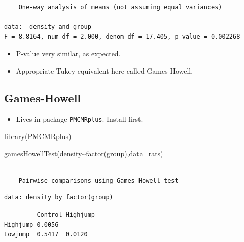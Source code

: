 \documentclass[
  letterpaper,
  DIV=11,
  numbers=noendperiod]{scrartcl}
\newenvironment{Shaded}{\begin{snugshade}}{\end{snugshade}}
\newcommand{\AttributeTok}[1]{\textcolor[rgb]{0.40,0.45,0.13}{#1}}
\newcommand{\FunctionTok}[1]{\textcolor[rgb]{0.28,0.35,0.67}{#1}}
\newcommand{\NormalTok}[1]{\textcolor[rgb]{0.00,0.23,0.31}{#1}}
\newcommand{\SpecialCharTok}[1]{\textcolor[rgb]{0.37,0.37,0.37}{#1}}
\providecommand{\tightlist}{%
  \setlength{\itemsep}{0pt}\setlength{\parskip}{0pt}}\usepackage{longtable,booktabs,array}
\begin{document}
\begin{verbatim}

    One-way analysis of means (not assuming equal variances)

data:  density and group
F = 8.8164, num df = 2.000, denom df = 17.405, p-value = 0.002268
\end{verbatim}

\begin{itemize}
\tightlist
\item
  P-value very similar, as expected.
\item
  Appropriate Tukey-equivalent here called Games-Howell.
\end{itemize}

\hypertarget{games-howell}{%
\subsection{Games-Howell}\label{games-howell}}

\begin{itemize}
\tightlist
\item
  Lives in package \texttt{PMCMRplus}. Install first.
\end{itemize}

\begin{Shaded}
\begin{Highlighting}[]
\FunctionTok{library}\NormalTok{(PMCMRplus)}
\end{Highlighting}
\end{Shaded}

\begin{Shaded}
\begin{Highlighting}[]
\FunctionTok{gamesHowellTest}\NormalTok{(density}\SpecialCharTok{\textasciitilde{}}\FunctionTok{factor}\NormalTok{(group),}\AttributeTok{data=}\NormalTok{rats)}
\end{Highlighting}
\end{Shaded}

\begin{verbatim}

    Pairwise comparisons using Games-Howell test
\end{verbatim}

\begin{verbatim}
data: density by factor(group)
\end{verbatim}

\begin{verbatim}
         Control Highjump
Highjump 0.0056  -       
Lowjump  0.5417  0.0120  
\end{verbatim}
\end{document}
